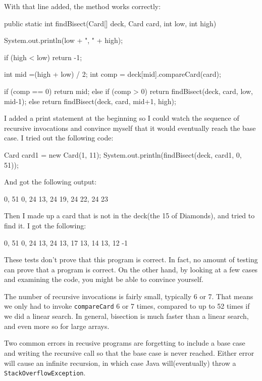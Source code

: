 \documentclass{book}
\begin{document}
With that line added, the method works correctly:

\begin{verbatimtab}
public static int findBisect(Card[] deck, Card card, int low, int high) {
    System.out.println(low + ", " + high);

    if (high < low) return -1;

    int mid =(high + low) / 2;
    int comp = deck[mid].compareCard(card);

    if (comp == 0) {
        return mid;
    } else if (comp > 0) {
        return findBisect(deck, card, low, mid-1);
    } else {
        return findBisect(deck, card, mid+1, high);
    }
}
\end{verbatimtab}

I added a print statement at the beginning so I could watch
the sequence of recursive invocations and convince myself
that it would eventually reach the base case.  I tried out the
following code:

\begin{verbatimtab}
    Card card1 = new Card(1, 11);
    System.out.println(findBisect(deck, card1, 0, 51));
\end{verbatimtab}
%
And got the following output:

\begin{verbatimtab}
0, 51
0, 24
13, 24
19, 24
22, 24
23
\end{verbatimtab}
%
Then I made up a card that is not in the deck(the 15 of Diamonds),
and tried to find it.  I got the following:

\begin{verbatimtab}
0, 51
0, 24
13, 24
13, 17
13, 14
13, 12
-1
\end{verbatimtab}
%
These tests don't prove that this program is correct.  In fact, no
amount of testing can prove that a program is correct.  On the other
hand, by looking at a few cases and examining the code, you might be
able to convince yourself.


The number of recursive invocations is fairly small, typically 6 or 7.
That means we only had to invoke {\tt compareCard} 6 or 7 times,
compared to up to 52 times if we did a linear search.  In general,
bisection is much faster than a linear search, and even more so for
large arrays.

Two common errors in recusive programs are forgetting to include a
base case and writing the recursive call so that the base case is never
reached.  Either error will cause an infinite recursion, in which case
Java will(eventually) throw a {\tt StackOverflowException}.
\end{document}
